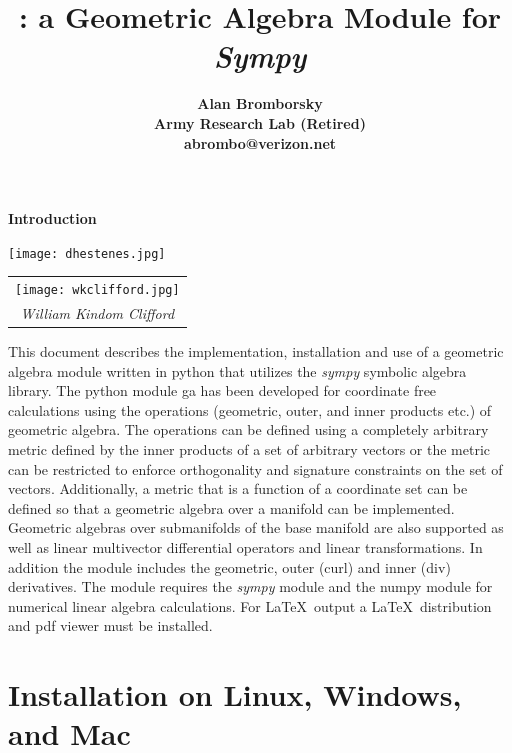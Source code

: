 \documentclass[12pt]{report}
\title{\galgebra: \bf\Large a Geometric Algebra Module for \emph{Sympy}}
\author{\bf Alan Bromborsky\\
\bf Army Research Lab (Retired)\\
\bf abrombo@verizon.net}
\begin{document}
\parskip 10pt

\maketitle
{\bf Introduction}\newline

\begin{center}
\texttt{[image: dhestenes.jpg]} \begin{tabular}{c}
\texttt{[image: wkclifford.jpg]} \\
\emph{William Kindom Clifford}
\end{tabular} 
\end{center}

   This document describes the implementation, installation and use of a
   geometric algebra module written in
   python that utilizes the \emph{sympy} symbolic algebra library.  The python
   module ga has been developed for coordinate free calculations using
   the operations (geometric, outer, and inner products etc.) of geometric algebra.
   The operations can be defined using a completely arbitrary metric defined
   by the inner products of a set of arbitrary vectors or the metric can be
   restricted to enforce orthogonality and signature constraints on the set of
   vectors.  Additionally, a metric that is a function of a coordinate set can
   be defined so that a geometric algebra over a manifold can be implemented.
   Geometric algebras over submanifolds of the base manifold are also supported as
   well as linear multivector differential operators and linear transformations.
   In addition the module includes the geometric, outer (curl) and inner
   (div) derivatives. The module requires the \emph{sympy} module and the numpy module for numerical linear
   algebra calculations.  For \LaTeX\ output a \LaTeX\ distribution and pdf viewer must be installed.
   

\tableofcontents

\chapter{Installation on Linux, Windows, and Mac}
\end{document}
